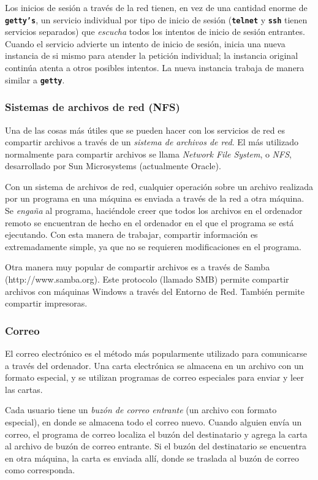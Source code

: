 \documentclass[12pt]{article}
\begin{document}
 Los inicios de sesión a través de la red tienen, en vez de una cantidad
enorme de \texttt{\textbf{getty's}}, un servicio individual por tipo de 
inicio de sesión (\texttt{\textbf{telnet}} y \texttt{\textbf{ssh}}
tienen servicios separados) que \textit{escucha} todos los intentos de inicio de
sesión entrantes. Cuando el servicio advierte un intento de inicio de sesión,
inicia una nueva instancia de si mismo para atender la petición individual; la
instancia original continúa atenta a otros posibles intentos. La nueva instancia
trabaja de manera similar a \texttt{\textbf{getty}}.  


\subsubsection{ Sistemas de archivos de red (NFS)}  Una de las cosas
más útiles que se pueden hacer con los servicios de red es compartir archivos a
través de un \textit{sistema de archivos de red}. El más utilizado
normalmente para compartir archivos se llama \textit{Network File
System}, o \textit{NFS}, desarrollado por Sun Microsystems (actualmente Oracle).  

 Con un sistema de archivos de red, cualquier operación sobre un archivo
realizada por un programa en una máquina es enviada a través de la red a otra
máquina. Se \textit{engaña} al programa, haciéndole creer que todos los archivos en el
ordenador remoto se encuentran de hecho en el ordenador en el que el programa se
está ejecutando. Con esta manera de trabajar, compartir información es
extremadamente simple, ya que no se requieren modificaciones en el programa.


 Otra manera muy popular de compartir archivos es a través de Samba
(http://www.samba.org). Este protocolo
(llamado SMB) permite compartir archivos con máquinas Windows a través del
Entorno de Red. También permite compartir impresoras.  



\subsubsection{ Correo}

 El correo electrónico es el método más popularmente utilizado para
comunicarse a través del ordenador. Una carta electrónica se almacena en un
archivo con un formato especial, y se utilizan programas de correo especiales
para enviar y leer las cartas.  

 Cada usuario tiene un \textit{buzón de correo entrante} (un
archivo con formato especial), en donde se almacena todo el correo nuevo. Cuando
alguien  envía un correo, el programa de correo localiza el buzón del
destinatario y agrega la carta al archivo de buzón de correo entrante. Si el
buzón del destinatario se encuentra en otra máquina, la carta es enviada allí,
donde se traslada al buzón de correo como corresponda.  
\end{document}
